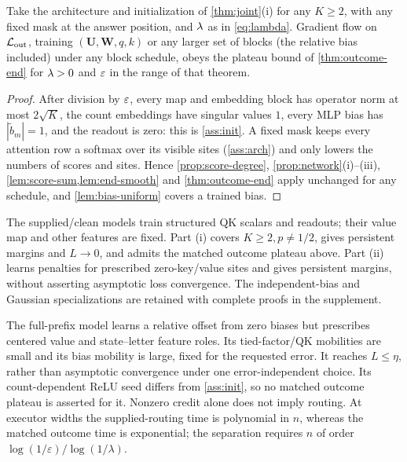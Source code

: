 \begin{corollary}
\label{cor:joint-outcome}
Take the architecture and initialization of \cref{thm:joint}(i) for any $K\ge2$, with any fixed mask at the answer position, and $\lambda$ as in
\cref{eq:lambda}. Gradient flow on $\mathcal L_{\mathrm{out}}$, training $(\mathbf U,\mathbf W,q,k)$ or any larger set of blocks (the relative bias included) under any block
schedule, obeys the plateau bound of \cref{thm:outcome-end} for $\lambda>0$ and $\varepsilon$ in the range of that theorem.
\end{corollary}

\begin{proof}
After division by $\varepsilon$, every map and embedding block has operator norm at most $2\sqrt K$, the count embeddings have singular values
$1$, every MLP bias has $|\tilde b_m|=1$, and the readout is zero: this is \cref{ass:init}. A fixed mask keeps every attention row a softmax over
its visible sites (\cref{ass:arch}) and only lowers the numbers of scores and sites. Hence \cref{prop:score-degree}, \cref{prop:network}(i)--(iii),
\cref{lem:score-sum,lem:end-smooth} and \cref{thm:outcome-end} apply unchanged for any schedule, and \cref{lem:bias-uniform} covers a trained bias.
\end{proof}

\begin{remark}\label{rem:joint-scope}
The supplied/clean models train structured QK scalars and readouts; their value map and other
features are fixed. Part (i) covers $K\ge2,p\ne1/2$, gives persistent margins and $L\to0$,
and admits the matched outcome plateau above. Part (ii) learns penalties for prescribed
zero-key/value sites and gives persistent margins, without asserting asymptotic loss convergence.
The independent-bias and Gaussian specializations are retained with complete proofs in the supplement.

The full-prefix model learns a relative offset from zero biases but prescribes centered value
and state--letter feature roles. Its tied-factor/QK mobilities are small and its bias mobility is
large, fixed for the requested error. It reaches $L\le\eta$, rather than asymptotic convergence
under one error-independent choice. Its count-dependent ReLU seed differs from \cref{ass:init},
so no matched outcome plateau is asserted for it. Nonzero credit alone does not imply routing.
At executor widths the supplied-routing time is polynomial in $n$, whereas the matched outcome
time is exponential; the separation requires $n$ of order
$\log(1/\varepsilon)/\log(1/\lambda)$.
\end{remark}


